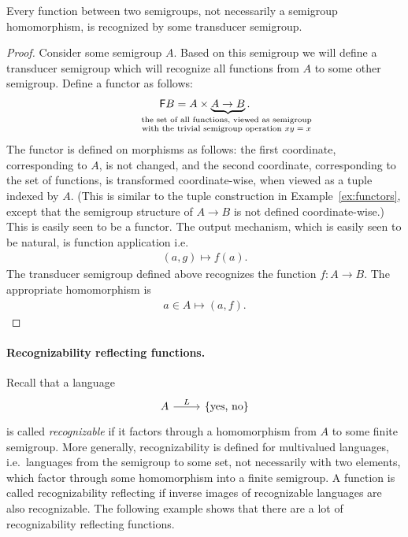 \begin{theorem}\label{thm:all-functions} 
     Every function    between two semigroups, not necessarily a semigroup homomorphism, is recognized  by some transducer semigroup.
\end{theorem}
\begin{proof}
    Consider some semigroup $A$. Based on this semigroup we will define a transducer semigroup which will recognize all functions from $A$ to some other semigroup. Define  a functor as follows:
\begin{align*}
\functor B = A \times \myunderbrace{A \to B}{the set of all  functions, viewed as semigroup \\ 
with the trivial semigroup operation $xy = x$}.
\end{align*}
The functor is defined on morphisms
as follows: the first coordinate, corresponding to $A$, is not changed, and the second coordinate, corresponding to the set of functions, is transformed   coordinate-wise, when viewed as a tuple indexed by $A$. (This is similar to the tuple construction in Example~\ref{ex:functors}, except that the semigroup structure of $A \to B$ is not defined coordinate-wise.)  This is easily seen to be a functor. 
The output mechanism, which is easily seen to be natural, is function application i.e.
\begin{align*}
    (a,g) \mapsto f(a).
\end{align*}
The transducer semigroup defined above recognizes the function $f : A \to B$. The appropriate homomorphism  is 
\begin{align*}
a \in A  \mapsto  (a,f).
\end{align*} 
\end{proof}

\paragraph*{Recognizability reflecting functions.} Recall that a language 
\[
\begin{tikzcd}
A 
\ar[r,"L"]
&
\set{\text{yes, no}}
\end{tikzcd}
\]
is called \emph{recognizable} if it factors through a homomorphism from $A$ to some finite semigroup.  More generally, recognizability is defined for multivalued languages, i.e.~languages from the semigroup to some set, not necessarily with two elements, which factor through some homomorphism into a finite semigroup. A function is called recognizability reflecting if  
inverse images of recognizable languages are also recognizable. The following example shows that there are a lot of recognizability reflecting functions.

